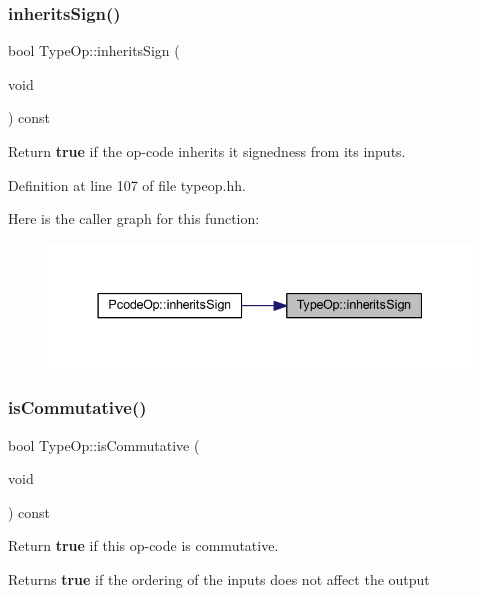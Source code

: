 \subsubsection{\texorpdfstring{inheritsSign()}{inheritsSign()}}
{\footnotesize\ttfamily bool Type\+Op\+::inherits\+Sign (\begin{DoxyParamCaption}\item[{void}]{ }\end{DoxyParamCaption}) const\hspace{0.3cm}{\ttfamily [inline]}}



Return {\bfseries{true}} if the op-\/code inherits it signedness from its inputs. 



Definition at line 107 of file typeop.\+hh.

Here is the caller graph for this function\+:
\nopagebreak
\begin{figure}[H]
\begin{center}
\leavevmode
\includegraphics[width=337pt]{class_type_op_a8440bbfcbdd6209b625048ee20db29c9_icgraph}
\end{center}
\end{figure}
\mbox{\label{class_type_op_a2d51c10873a61d54a5c4c30221f5706e}} 
\subsubsection{\texorpdfstring{isCommutative()}{isCommutative()}}
{\footnotesize\ttfamily bool Type\+Op\+::is\+Commutative (\begin{DoxyParamCaption}\item[{void}]{ }\end{DoxyParamCaption}) const}



Return {\bfseries{true}} if this op-\/code is commutative. 

\begin{DoxyReturn}{Returns}
{\bfseries{true}} if the ordering of the inputs does not affect the output 
\end{DoxyReturn}


